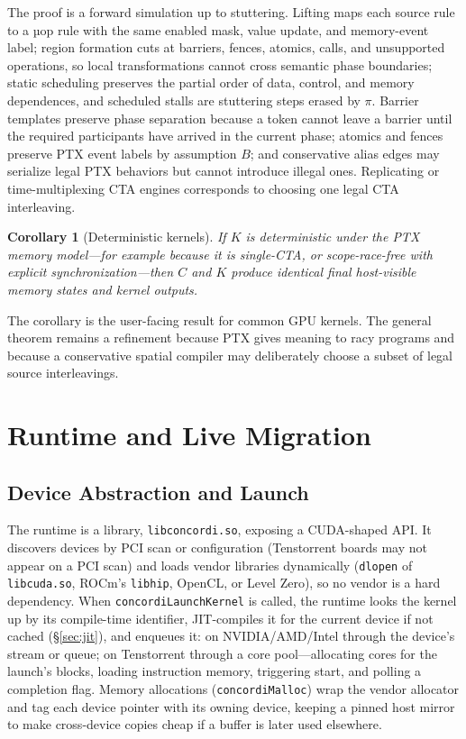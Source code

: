 \documentclass[sigplan,nonacm]{acmart}
\newtheorem{corollary}{Corollary}
\begin{document}
\noindent
The proof is a forward simulation up to stuttering.  Lifting maps each
source rule to a µop rule with the same enabled mask, value update, and
memory-event label; region formation cuts at barriers, fences, atomics,
calls, and unsupported operations, so local transformations cannot cross
semantic phase boundaries; static scheduling preserves the partial order of
data, control, and memory dependences, and scheduled stalls are stuttering
steps erased by $\pi$.  Barrier templates preserve phase separation because
a token cannot leave a barrier until the required participants have arrived
in the current phase; atomics and fences preserve PTX event labels by
assumption $B$; and conservative alias edges may serialize legal PTX
behaviors but cannot introduce illegal ones.  Replicating or
time-multiplexing CTA engines corresponds to choosing one legal CTA
interleaving.

\begin{corollary}[Deterministic kernels]
\label{cor:deterministic}
If $K$ is deterministic under the PTX memory model---for example because it
is single-CTA, or scope-race-free with explicit synchronization---then $C$
and $K$ produce identical final host-visible memory states and kernel
outputs.
\end{corollary}

The corollary is the user-facing result for common GPU kernels.  The general
theorem remains a refinement because PTX gives meaning to racy programs and
because a conservative spatial compiler may deliberately choose a subset of
legal source interleavings.

\section{Runtime and Live Migration}
\label{sec:runtime}

\subsection{Device Abstraction and Launch}
\label{sec:runtime-abstraction}

The runtime is a library, \texttt{libconcordi.so}, exposing a CUDA-shaped
API.  It discovers devices by PCI scan or configuration (Tenstorrent boards
may not appear on a PCI scan) and loads vendor libraries dynamically
(\texttt{dlopen} of \texttt{libcuda.so}, ROCm's \texttt{libhip}, OpenCL, or
Level Zero), so no vendor is a hard dependency.  When
\texttt{concordiLaunchKernel} is called, the runtime looks the kernel up by
its compile-time identifier, JIT-compiles it for the current device if not
cached (\S\ref{sec:jit}), and enqueues it: on NVIDIA/AMD/Intel through the
device's stream or queue; on Tenstorrent through a core pool---allocating
cores for the launch's blocks, loading instruction memory, triggering start,
and polling a completion flag.  Memory allocations
(\texttt{concordiMalloc}) wrap the vendor allocator and tag each device
pointer with its owning device, keeping a pinned host mirror to make
cross-device copies cheap if a buffer is later used elsewhere.
\end{document}
